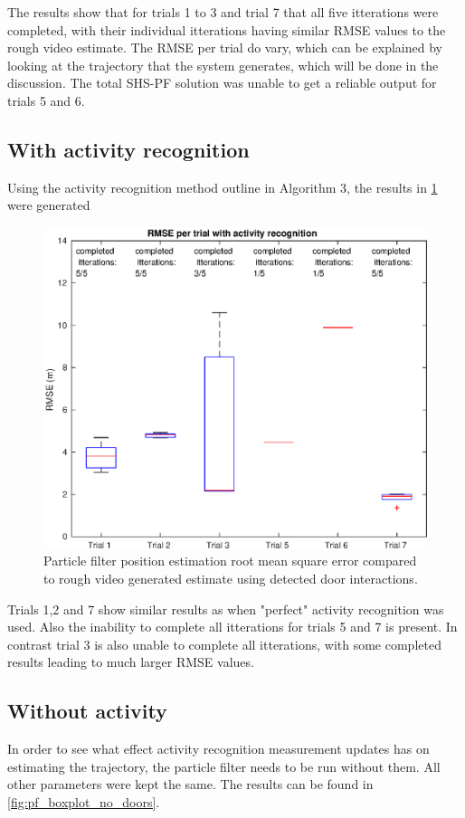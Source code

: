 The results show that for trials 1 to 3 and trial 7 that all five itterations were completed, with their individual itterations having similar RMSE values to the rough video estimate. The RMSE per trial do vary, which can be explained by looking at the trajectory that the system generates, which will be done in the discussion. The total SHS-PF solution was unable to get a reliable output for trials 5 and 6.\par 
\newpage
\subsection{With activity recognition}

Using the activity recognition method outline in Algorithm 3, the results in \cref{fig:rmse_per_trial_with_activity_recognition} were generated

\begin{figure}[H]
	\centering
	\includegraphics[width=0.7\linewidth]{images/20201118_1211_RMSE_per_trial_with_activity_recognition}
	\caption[Particle Filter position estimation performance with door interaction]{Particle filter position estimation root mean square error compared to rough video generated estimate using detected door interactions.}
	\label{fig:rmse_per_trial_with_activity_recognition}
\end{figure}

Trials 1,2 and 7 show similar results as when "perfect" activity recognition was used. Also the inability to complete all itterations for trials 5 and 7 is present. In contrast trial 3 is also unable to complete all itterations, with some completed results leading to much larger RMSE values. 

\newpage
\subsection{Without activity}
In order to see what effect activity recognition measurement updates has on estimating the trajectory, the particle filter needs to be run without them. All other parameters were kept the same. The results can be found in \cref{fig:pf_boxplot_no_doors}.


